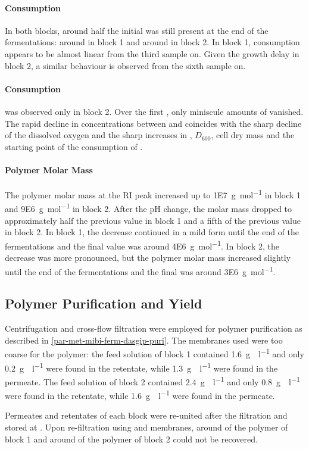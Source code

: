 \paragraph{\GLC{} Consumption}
In both blocks, around half the initial \glc{} was still present at the end of the fermentations: around  in block 1 and around  in block 2. In block 1, \glc{} consumption appears to be almost linear from the third sample on. Given the growth delay in block 2, a similar behaviour is observed from the sixth sample on.

\paragraph{\FUR{} Consumption}
\FUR{} was observed only in block 2. Over the first , only miniscule amounts of \fur{} vanished. The rapid decline in \fur{} concentrations between  and  coincides with the sharp decline of the dissolved oxygen and the sharp increases in , $D_{600}$, cell dry mass and the starting point of the consumption of \glc{}.

\paragraph{Polymer Molar Mass}
The polymer molar mass at the RI peak increased up to \SI{1E7}{\gram\per\mole} in block 1 and \SI{9E6}{\gram\per\mole} in block 2. After the pH change, the molar mass dropped to approximately half the previous value in block 1 and a fifth of the previous value in block 2. In block 1, the decrease continued in a mild form until the end of the fermentations and the final value was around \SI{4E6}{\gram\per\mole}. In block 2, the decrease was more pronounced, but the polymer molar mass increased slightly until the end of the fermentations and the final was around \SI{3E6}{\gram\per\mole}.

\subsection{Polymer Purification and Yield}
Centrifugation and cross-flow filtration were employed for polymer purification as described in \vref{par-met-mibi-ferm-dasgip-puri}. The  membranes used were too coarse for the polymer: the feed solution of block 1 contained \SI{1.6}{\gram\eps\per\litre} and only \SI{0.2}{\gram\eps\per\litre} were found in the retentate, while \SI{1.3}{\gram\eps\per\litre} were found in the permeate. The feed solution of block 2 contained \SI{2.4}{\gram\eps\per\litre} and only \SI{0.8}{\gram\eps\per\litre} were found in the retentate, while \SI{1.6}{\gram\eps\per\litre} were found in the permeate.

Permeates and retentates of each block were re-united after the filtration and stored at . Upon re-filtration using  and  membranes, around  of the polymer of block 1 and around  of the polymer of block 2 could not be recovered.

